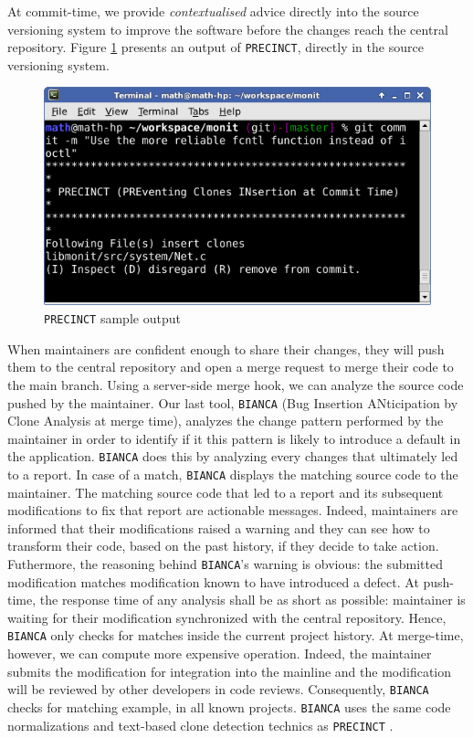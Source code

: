 At commit-time, we provide {\it contextualised} advice directly into the source versioning system to improve the software before the changes reach the central repository.
Figure \ref{fig:precinct-intro} presents an output of {\tt PRECINCT}, directly in the source versioning system.

\begin{figure}[h!]
	\centering
	\includegraphics[scale=0.7]{media/commit.png}
	\caption{{\tt PRECINCT} sample output}
	\label{fig:precinct-intro}
\end{figure}

When maintainers are confident enough to share their changes, they will push them to the central repository and open a merge request to merge their code to the main branch.
Using a server-side merge hook, we can analyze the source code pushed by the maintainer.
Our last tool, {\tt BIANCA} (Bug Insertion ANticipation by Clone Analysis at merge time), analyzes the change pattern performed by the maintainer in order to identify if it this pattern is likely to introduce a default in the application.
{\tt BIANCA} does this by analyzing every changes that ultimately led to a report.
In case of a match, {\tt BIANCA} displays the matching source code to the maintainer.
The matching source code that led to a report and its subsequent modifications to fix that report are actionable messages.
Indeed, maintainers are informed that their modifications raised a warning and they can see how to transform their code, based on the past history, if they decide to take action.
Futhermore, the reasoning behind {\tt BIANCA}'s warning is obvious: the submitted modification matches modification known to have introduced a defect.
At push-time, the response time of any analysis shall be as short as possible: maintainer is waiting for their modification synchronized with the central repository.
Hence, {\tt BIANCA} only checks for matches inside the current project history.
At merge-time, however, we can compute more expensive operation.
Indeed, the maintainer submits the modification for integration into the mainline and the modification will be reviewed by other developers in code reviews.
Consequently, {\tt BIANCA} checks for matching example, in all known projects.
{\tt BIANCA} uses the same code normalizations and text-based clone detection technics as {\tt PRECINCT} \cite{Cordy2006,ROY2009,Cordy2011}.

